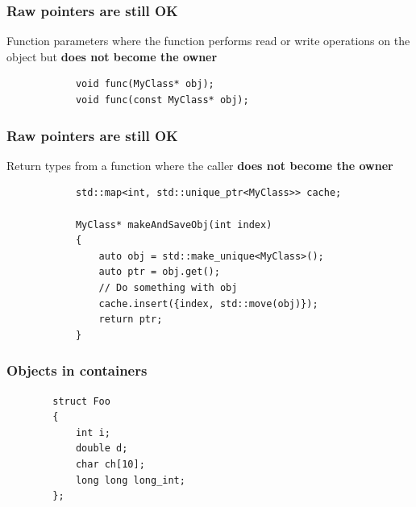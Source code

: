 \documentclass{beamer}
\begin{document}
\begin{frame}[fragile]
\frametitle{Raw pointers are still OK}
	Function parameters where the function performs read or write operations
	on the object but \textbf{does not become the owner}
	\begin{example}
		\begin{lstlisting}
			void func(MyClass* obj);
			void func(const MyClass* obj);
		\end{lstlisting}
	\end{example}
\end{frame}

\begin{frame}[fragile]
\frametitle{Raw pointers are still OK}
	Return types from a function where the caller \textbf{does not become the owner}
	\begin{example}
		\begin{lstlisting}
			std::map<int, std::unique_ptr<MyClass>> cache;
			
			MyClass* makeAndSaveObj(int index)
			{
				auto obj = std::make_unique<MyClass>();
				auto ptr = obj.get();
				// Do something with obj
				cache.insert({index, std::move(obj)});
				return ptr;
			}
		\end{lstlisting}
	\end{example}
\end{frame}

\begin{frame}[fragile,t]
\frametitle{Objects in containers}
    \begin{lstlisting}
        struct Foo
        {
            int i;
            double d;
            char ch[10];
            long long long_int;
        };
    \end{lstlisting}


\end{frame}
\end{document}
